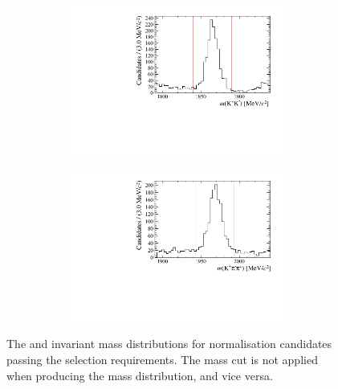 \begin{figure}[!h]
\begin{subfigure}[t]{1.0\textwidth}
   \centering
     \begin{subfigure}[t]{0.35\textwidth}
        \centering
        \includegraphics[width=1.0\textwidth]{figs/Selection/Phimass_KPiPi_B2DsD0.pdf}
     \end{subfigure}
     \begin{subfigure}[t]{0.35\textwidth}
        \centering
        \includegraphics[width=1.0\textwidth]{figs/Selection/Dmass_KPiPi_B2DsD0.pdf}
     \end{subfigure}
     \caption{\decay{\Bp}{(\decay{\Dsp}{\Kp\pim\pip})\Dzb}}
   \end{subfigure}
   \caption{The \Dsp and \Dzb invariant mass distributions for normalisation \decay{\Bp}{\Dsp\Dzb} candidates passing the selection requirements. The \Dsp mass cut is not applied when producing the \Dzb mass distribution, and vice versa.}
   \label{fig:d_phi_mass_normlaisation}   
\end{figure}
